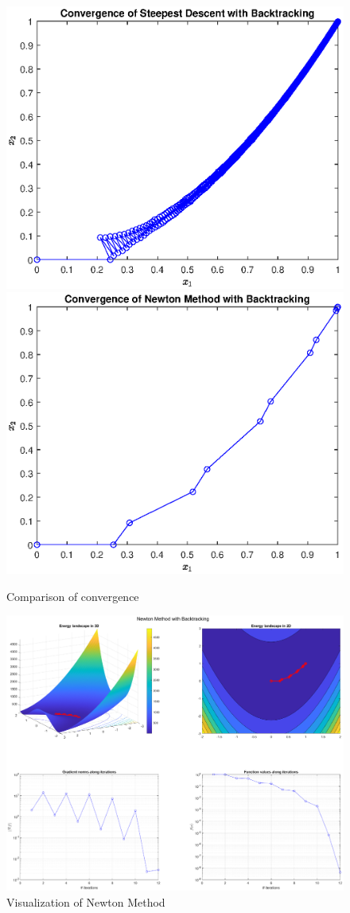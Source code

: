 \documentclass[unicode,11pt,a4paper,oneside,numbers=endperiod,openany]{scrartcl}
\begin{document}
\begin{figure}[H]
    \centering
    \caption{Comparison of convergence}
    \label{fig:ex1-convergence-comparison}
    \includegraphics[width=.5\textwidth, trim={0cm 0cm 0cm 0cm}, clip]{./figures/ex1-sd-backtracking-convergence.eps}
    \includegraphics[width=.49\textwidth, trim={0cm 0cm 0cm 0cm}, clip]{./figures/ex1-newton-backtracking-convergence.eps}
\end{figure}

\begin{figure}[H]
    \centering
    \caption{Visualization of Newton Method}
    \label{fig:ex1-newton-energy}
    \includegraphics[width=\textwidth, trim={4cm 2.5cm 4cm 1.5cm}, clip]{./figures/ex1-newton-backtracking-energy.eps}
\end{figure}
\end{document}
